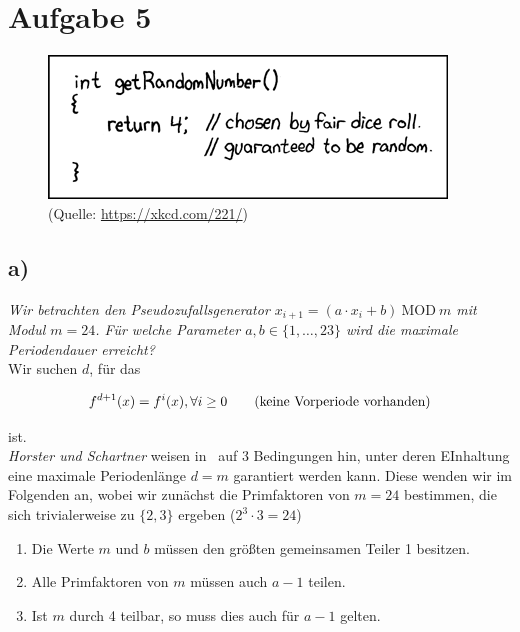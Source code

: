 \chapter{Aufgabe 5}

\begin{figure}
    \centering
    \includegraphics[scale=0.6]{aufgabe 5/img/xkcd221}
    \caption{(Quelle: \url{https://xkcd.com/221/})}
    \label{fig:xkcd221}
\end{figure}


\section{a)}

\textit{Wir betrachten den Pseudozufallsgenerator $x_{i+1} = (a \cdot x_i + b) \ \text{MOD}\ m$ mit Modul
$m = 24$. Für welche Parameter $a,b \in \{1, \ldots, 23\}$ wird die maximale Periodendauer
erreicht?}\\

\noindent
Wir suchen $d$, für das

\begin{equation}\notag
    f^{d+1}(x) = f^i(x), \forall i \geq 0 \qquad{\text{(keine Vorperiode vorhanden)}}
\end{equation}

\noindent
ist.\\

\noindent
\textit{Horster und Schartner} weisen in~\cite[83]{ITS3} auf 3 Bedingungen hin, unter deren EInhaltung eine maximale Periodenlänge $d=m$ garantiert werden kann.
Diese wenden wir im Folgenden an, wobei wir zunächst die Primfaktoren von $m = 24$ bestimmen, die sich trivialerweise zu $\{2, 3\}$ ergeben ($2^3 \cdot 3 = 24$)

\begin{enumerate}
    \itemsep0.5em
    \item Die Werte $m$ und $b$ müssen den größten gemeinsamen Teiler 1 besitzen.
    \item Alle Primfaktoren von $m$ müssen auch $a-1$ teilen.
    \item Ist $m$ durch 4 teilbar, so muss dies auch für $a-1$ gelten.
\end{enumerate}

